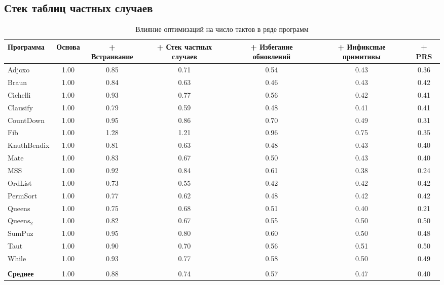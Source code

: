 \documentclass[flenqn, 14pt]{extarticle}
\begin{document}
\subsection{Стек таблиц частных случаев}
\begin{table}[t]
\caption{Влияние оптимизаций на число тактов в ряде программ}
\label{tab:clock-cycle_optimisations}
\begin{tabularx}{\textwidth}{L{1.3}C{0.7}C{1}C{1}C{1}C{1}C{1}}
\hline\hline
Программа & Основа & + Встраивание & + Стек частных случаев & + Избегание обновлений & + Инфиксные примитивы & + PRS \\
\hline
Adjoxo      & 1.00 & 0.85 & 0.71 & 0.54 & 0.43 & 0.36 \\
Braun       & 1.00 & 0.84 & 0.63 & 0.46 & 0.43 & 0.42 \\
Cichelli    & 1.00 & 0.93 & 0.77 & 0.56 & 0.42 & 0.41 \\
Clausify    & 1.00 & 0.79 & 0.59 & 0.48 & 0.41 & 0.41 \\
CountDown   & 1.00 & 0.95 & 0.86 & 0.70 & 0.49 & 0.31 \\
Fib         & 1.00 & 1.28 & 1.21 & 0.96 & 0.75 & 0.35 \\
KnuthBendix & 1.00 & 0.81 & 0.63 & 0.48 & 0.43 & 0.40 \\
Mate        & 1.00 & 0.83 & 0.67 & 0.50 & 0.43 & 0.40 \\
MSS         & 1.00 & 0.92 & 0.84 & 0.61 & 0.38 & 0.24 \\
OrdList     & 1.00 & 0.73 & 0.55 & 0.42 & 0.42 & 0.42 \\
PermSort    & 1.00 & 0.77 & 0.62 & 0.48 & 0.42 & 0.42 \\
Queens      & 1.00 & 0.75 & 0.68 & 0.51 & 0.40 & 0.21 \\
Queens$_2$  & 1.00 & 0.82 & 0.67 & 0.55 & 0.50 & 0.50 \\
SumPuz      & 1.00 & 0.95 & 0.80 & 0.60 & 0.50 & 0.48 \\
Taut        & 1.00 & 0.90 & 0.70 & 0.56 & 0.51 & 0.50 \\
While       & 1.00 & 0.93 & 0.77 & 0.58 & 0.50 & 0.49 \\
            &      &      &      &      &      &      \\
\textbf{Среднее} & 1.00 & 0.88 & 0.74 & 0.57 & 0.47 & 0.40 \\       
\hline\hline
\end{tabularx}
\end{table}
\end{document}
